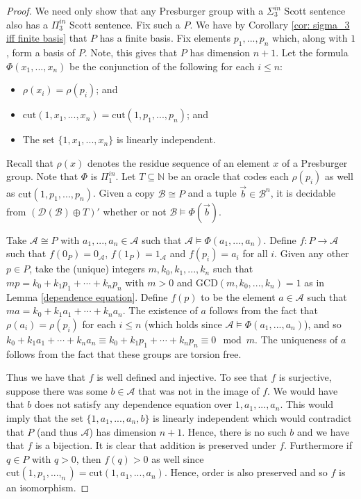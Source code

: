 \documentclass{amsart}%
\numberwithin{theorem}{section}
\newcommand{\N}{\mathbb{N}}
\newcommand{\A}{\mathcal{A}}
\newcommand{\B}{\mathcal{B}}
\newcommand{\D}{\mathcal{D}}
\newcommand{\0}{\emptyset}
\newcommand{\cut}{\text{cut}}
\begin{document}
\begin{proof}
    We need only show that any Presburger group with a $\Sigma^{in}_3$ Scott sentence also has a $\Pi^{in}_3$ Scott sentence. Fix such a $P$. We have by Corollary \ref{cor: sigma_3 iff finite basis} that $P$ has a finite basis. Fix elements $p_1,...,p_n$ which, along with $1$, form a basis of $P$. Note, this gives that $P$ has dimension $n+1$. Let the formula $\Phi(x_1,...,x_n)$ be the conjunction of the following for each $i\leq n$:

    \begin{itemize}
        \item $\rho(x_i)=\rho(p_i)$; and
        \item $\cut(1,x_1,...,x_n)=\cut(1,p_1,...,p_n)$; and
        \item The set $\{1,x_1,...,x_n\}$ is linearly independent.
    \end{itemize}
    Recall that $\rho(x)$ denotes the residue sequence of an element $x$ of a Presburger group. Note that $\Phi$ is $\Pi^{in}_1$. Let $T\subseteq\N$ be an oracle that codes each $\rho(p_i)$ as well as $\cut(1,p_1,...,p_n)$. Given a copy $\B\cong P$ and a tuple $\vec b \in \B^n$, it is decidable from $(\D(\B)\oplus T)'$ whether or not $\B\models \Phi(\vec b)$.
    
    Take $\A\cong P$ with $a_1,...,a_n\in \A$ such that $\A\models \Phi(a_1,...,a_n)$. Define $f:P\to \A$ such that $f(0_P)=0_\A$, $f(1_P)=1_\A$ and $f(p_i)=a_i$ for all $i$. Given any other $p\in P$, take the (unique) integers $m,k_0,k_1,...,k_n$ such that $mp=k_0+k_1p_1+\cdots +k_np_n$ with $m>0$ and GCD$(m,k_0,...,k_n)=1$ as in Lemma \ref{dependence equation}.  Define $f(p)$ to be the element $a\in \A$ such that $ma=k_0 + k_1a_1+ \cdots+ k_na_n$. The existence of $a$ follows from the fact that $\rho(a_i)=\rho(p_i)$ for each $i\leq n$ (which holds since $\A\models \Phi(a_1,...,a_n)$), and so $k_0 +k_1a_1 +\cdots + k_na_n\equiv k_0 + k_1p_1 +\cdots +k_np_n \equiv 0 \mod m$. The uniqueness of $a$ follows from the fact that these groups are torsion free.

    Thus we have that $f$ is well defined and injective. To see that $f$ is surjective, suppose there was some $b\in \A$ that was not in the image of $f$. We would have that $b$ does not satisfy any dependence equation over $1, a_1,...,a_n$. This would imply that the set $\{1,a_1,...,a_n,b\}$ is linearly independent which would contradict that $P$ (and thus $\A$) has dimension $n+1$. Hence, there is no such $b$ and we have that $f$ is a bijection. It is clear that addition is preserved under $f$. Furthermore if $q\in P$ with $q>0$, then $f(q)>0$ as well since $\cut(1,p_1,...,_n)=\cut(1,a_1,...,a_n)$. Hence, order is also preserved and so $f$ is an isomorphism. 


\end{proof}
\end{document}
